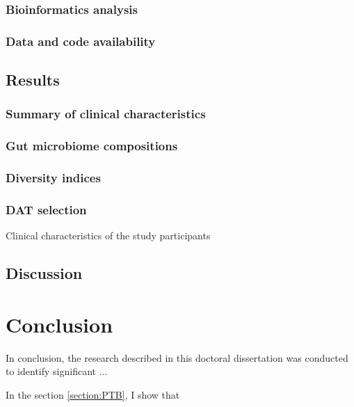 \documentclass[11pt, a4paper, onecolumn, oneside]{report}
\begin{document}
            \subsubsection{Bioinformatics analysis}
            \subsubsection{Data and code availability}
        \clearpage

        \subsection{Results}
            \subsubsection{Summary of clinical characteristics}
            \subsubsection{Gut microbiome compositions}
            \subsubsection{Diversity indices}
            \subsubsection{DAT selection}

            \begin{table}[p]
                \caption{Clinical characteristics of the study participants}
                \label{tab:colon-clinical}
            \end{table}
            \clearpage
        \clearpage

        \subsection{Discussion}
        \clearpage
    \newpage

    \section{Conclusion}
        \label{section:conclusion}
        In conclusion, the research described in this doctoral dissertation was conducted to identify significant ...

        In the section \ref{section:PTB}, I show that
        \newpage
\end{document}
